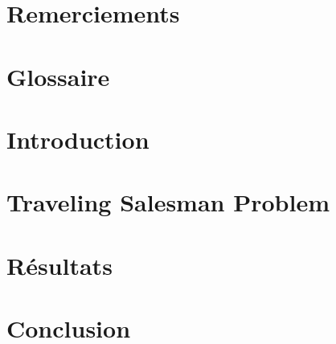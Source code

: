 \documentclass[a4paper,11pt,oneside,fleqn]{book}
\numberwithin{equation}{chapter}									        %
\begin{document}
% 

\frontmatter
\chapter*{Remerciements}


\tableofcontents

\chapter*{Glossaire}


\mainmatter
\chapter{Introduction} \label{ch:intro}
\vspace*{-50pt}

\chapter{Traveling Salesman Problem} \label{ch:tsp}
\vspace*{-50pt}

\chapter{Résultats} \label{ch:resultats}
\vspace*{-50pt}

\chapter{Conclusion} \label{ch:conclusion}
\vspace*{-50pt}


% 

\newpage
\nocite{*}



% 
\end{document}
